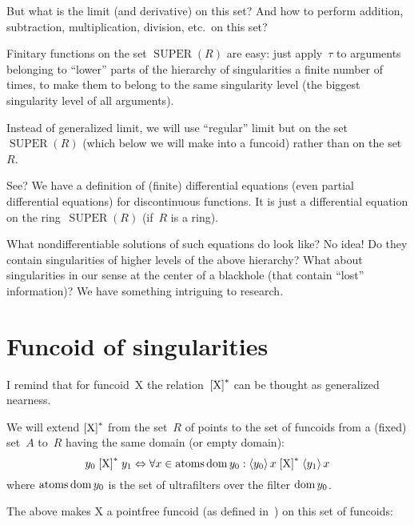 But what is the limit (and derivative) on this set? And how to perform addition, subtraction, multiplication, division, etc.\ on this set?

Finitary functions on the set $\operatorname{SUPER}(R)$ are easy: just apply~$\tau$ to arguments belonging to ``lower'' parts of the hierarchy of singularities a finite number of times, to make them to belong to the same singularity level (the biggest singularity level of all arguments).

Instead of generalized limit, we will use ``regular'' limit but on the set $\operatorname{SUPER}(R)$ (which below we will make into a funcoid) rather than on the set~$R$.

See? We have a definition of (finite) differential equations (even partial differential equations) for discontinuous functions. It is just a differential equation on the ring~$\operatorname{SUPER}(R)$ (if~$R$ is a ring).

What nondifferentiable solutions of such equations do look like? No idea! Do they contain singularities of higher levels of the above hierarchy? What about singularities in our sense at the center of a blackhole (that contain ``lost'' information)? We have something intriguing to research.

\chapter{Funcoid of singularities}

I remind that for funcoid~$\mathrm{X}$ the relation~$\mathrel{\left[\mathrm{X}\right]^{\ast}}$ can be thought as generalized nearness.

We will extend $\mathrel{\left[\mathrm{X}\right]^{\ast}}$ from the set~$R$ of points to the set of funcoids from a (fixed) set~$A$ to~$R$ having the same domain (or empty domain):
\[
y_0 \mathrel{\left[\mathrm{X}\right]^{\ast}} y_1 \Leftrightarrow
\forall x\in\operatorname{atoms}\operatorname{dom} y_0:
\left\langle y_0\right\rangle x \mathrel{\left[\mathrm{X}\right]^{\ast}} \left\langle y_1\right\rangle x
\]
where $\operatorname{atoms}\operatorname{dom} y_0$ is the set of ultrafilters over the filter $\operatorname{dom} y_0$.

The above makes $\mathrm{X}$ a pointfree funcoid (as defined in~\cite{volume-1-edition1}) on this set of funcoids:

